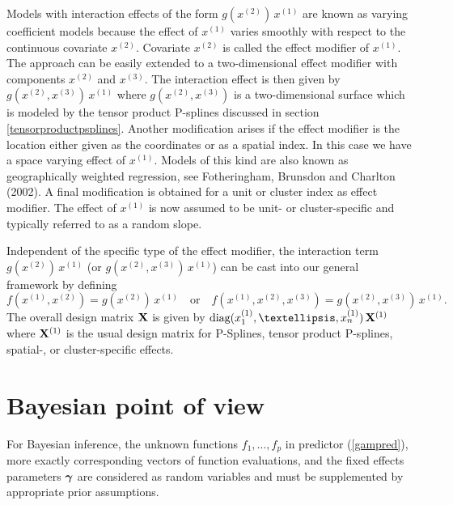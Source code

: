 \documentclass[11pt,a4paper,twoside]{bayesxarticle}
\begin{document}
Models with interaction effects of the form $g(x^{(2)}) \, x^{(1)}$
are  known as varying coefficient models  because the effect of
$x^{(1)}$ varies smoothly with respect to the continuous covariate
$x^{(2)}$. Covariate $x^{(2)}$ is called the effect modifier of
$x^{(1)}$. The approach can be easily extended to a two-dimensional
effect modifier with components $x^{(2)}$ and $x^{(3)}$. The
interaction effect is then given by $g(x^{(2)},x^{(3)}) \, x^{(1)}$
where $g(x^{(2)},x^{(3)})$ is a two-dimensional surface which is
modeled by the tensor product P-splines discussed in section
\ref{tensorproductpsplines}. Another modification arises if the
effect modifier is the location either given as the coordinates or
as a spatial index. In this case we have a space varying effect of
$x^{(1)}$. Models of this kind are also known as geographically
weighted regression, see Fotheringham, Brunsdon and Charlton (2002).
A final modification is obtained for a unit or cluster index as
effect modifier. The effect of $x^{(1)}$ is now assumed to be unit-
or cluster-specific and typically referred to as a random slope.

Independent of the specific type of the effect modifier, the interaction term $g\left(x^{(2)}\right) \, x^{(1)}$
(or $g\left(x^{(2)},x^{(3)}\right) \, x^{(1)}$) can be cast into our
general framework by defining
\begin{equation}
\label{gampspline_varcoeffterm}
f\left(x^{(1)},x^{(2)}\right) = g\left(x^{(2)}\right) \, x^{(1)} \quad \mbox{or} \quad  f\left(x^{(1)},x^{(2)},x^{(3)}\right) =
g\left(x^{(2)},x^{(3)}\right) \, x^{(1)}.
\end{equation}
The overall design matrix $\mathbf{X}$ is given by
$\diag(x_{1}^{(1)},\dots,x_{n}^{(1)}) \, \Xvec^{(1)}$ where
$\mathbf{X}^{(1)}$ is the usual design matrix for P-Splines, tensor
product P-splines, spatial-, or cluster-specific effects.



\section{Bayesian point of view}
\label{priorassumptions}

For Bayesian inference, the unknown functions $f_{1},\dots ,f_{p}$
in predictor (\ref{gampred}), more exactly corresponding vectors of
function evaluations, and the fixed effects parameters $\boldsymbol{\gamma}$ are
considered as random variables and must be supplemented by
appropriate prior assumptions.
\end{document}
